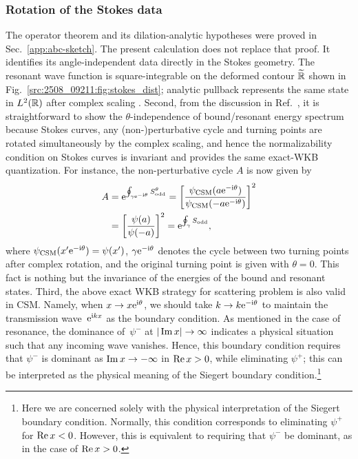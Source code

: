 \subsubsection{Rotation of the Stokes data}
The operator theorem and its dilation-analytic hypotheses were proved in
Sec.~\ref{app:abc-sketch}.  The present calculation does not replace that
proof.  It identifies its angle-independent data directly in the Stokes
geometry.  The resonant wave function is square-integrable on the deformed
contour $\widetilde{\mathbb{R}}$ shown in
Fig.~\ref{src:2508_09211:fig:stokes_dist}; analytic pullback represents the
same state in $L^2(\mathbb{R})$ after complex scaling
\cite{Morikawa:2025grx,Morikawa:2025xjq}.
Second, from the discussion in Ref.~\cite{Morikawa:2025xjq}, it is straightforward to show the $\theta$-independence of bound/resonant energy spectrum because Stokes curves, any (non-)perturbative cycle and turning points are rotated simultaneously by the complex scaling, and hence the normalizability condition on Stokes curves is invariant and provides the same exact-WKB quantization.
For instance, the non-perturbative cycle $A$ is now given by
\begin{align}
    A &= \mathrm{e}^{\oint_{\gamma \mathrm{e}^{-\mathrm{i} \theta}} S_{\mathrm{odd}}^\theta}
    = \left[\frac{\psi_{\mathrm{CSM}}(a \mathrm{e}^{-\mathrm{i} \theta})}{\psi_{\mathrm{CSM}}(-a \mathrm{e}^{-\mathrm{i} \theta})}\right]^2\notag\\
    &= \left[\frac{\psi(a)}{\psi(-a)}\right]^2
    = \mathrm{e}^{\oint_{\gamma} S_{\mathrm{odd}}} ,
\end{align}
where $\psi_{\mathrm{CSM}}(x' \mathrm{e}^{-\mathrm{i} \theta}) = \psi(x')$, $\gamma \mathrm{e}^{-\mathrm{i} \theta}$ denotes the cycle between two turning points after complex rotation, and the original turning point is given with $\theta=0$.
This fact is nothing but the invariance of the energies of the bound and resonant states.
Third, the above exact WKB strategy for scattering problem is also valid in CSM. Namely, when $x\to x \mathrm{e}^{\mathrm{i} \theta}$, we should take $k\to k \mathrm{e}^{-\mathrm{i} \theta}$ to maintain the transmission wave~$\mathrm{e}^{\mathrm{i} kx}$ as the boundary condition.
As mentioned in the case of resonance, the dominance of~$\psi^{-}$ at $|\operatorname{Im} x|\to\infty$ indicates a physical situation such that any incoming wave vanishes.
Hence, this boundary condition requires that $\psi^-$ is dominant as $\operatorname{Im} x \to - \infty$ in $\operatorname{Re} x >0$, while eliminating $\psi^+$; this can be interpreted as the physical meaning of the Siegert boundary condition.\footnote{Here we are concerned solely with the physical interpretation of the Siegert boundary condition. Normally, this condition corresponds to eliminating $\psi^+$ for $\operatorname{Re} x <0$. However, this is equivalent to requiring that $\psi^-$ be dominant, as in the case of $\operatorname{Re} x >0$.}
